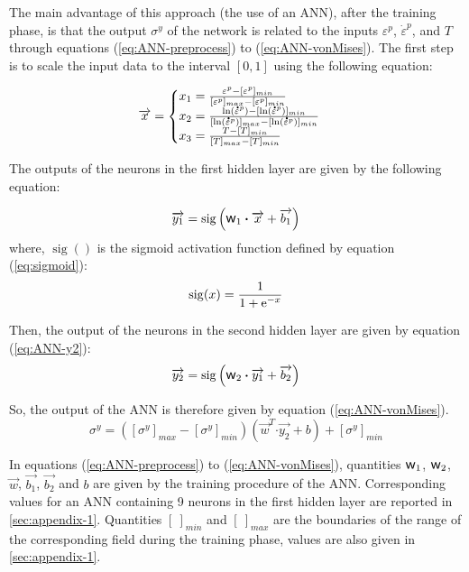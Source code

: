 \documentclass[preprint,12pt,times]{elsarticle}
\newcommand{\e}[1]{\mbox{\ensuremath{\mathrm{e}^{#1}}}}
\DeclareMathOperator{\sigmoid}{sig}
\newcommand{\dotp}{\boldsymbol{\cdot}}
\newcommand{\w}{\mbox{\large\ensuremath{\mathsf{w}}}}
\newcommand{\mdot}[1]{\accentset{\mbox{\bfseries .}}{#1}}
\begin{document}
The main advantage of this approach (the use of an ANN), after the training phase, is that the output $\sigma^y$ of the network is related to the inputs $\varepsilon^p$, ${\dot{\varepsilon}}^p$, and $T$ through equations (\ref{eq:ANN-preprocess}) to (\ref{eq:ANN-vonMises}). The first step is to scale the input data to the interval $[0,1]$ using the following equation:

\begin{equation}
\overrightarrow{x} =
\begin{cases}
x_1 = \frac{\varepsilon^p - [\varepsilon^p]_{min}}{[\varepsilon^p]_{max} - [\varepsilon^p]_{min}}\\
x_2 = \frac{\ln(\mdot{\varepsilon}^p)-[\ln(\mdot{\varepsilon}^p)]_{min}}{[\ln(\mdot{\varepsilon}^p)]_{max}-[\ln(\mdot{\varepsilon}^p)]_{min}}\label{eq:ANN-preprocess}\\
x_3 = \frac{T-[T]_{min}}{[T]_{max}-[T]_{min}}
\end{cases}
\end{equation}

The outputs of the neurons in the first hidden layer are given by the following equation:

\begin{equation}
\overrightarrow{y_1} = \sigmoid\left(\w_1 \dotp \overrightarrow{x}+ \overrightarrow{b_1}\right)\label{eq:ANN-y1}
\end{equation}
where, $\sigmoid()$ is the sigmoid activation function defined by equation (\ref{eq:sigmoid}):
\begin{equation}
\sigmoid(x)=\frac{1}{1 + \e{-x}}\label{eq:sigmoid}
\end{equation}

Then, the output of the neurons in the second hidden layer are given by equation (\ref{eq:ANN-y2}):
\begin{equation}
\overrightarrow{y_2} = \sigmoid\left(\w_2 \dotp \overrightarrow{y_1}+ \overrightarrow{b_2}\right)\label{eq:ANN-y2}
\end{equation}

So, the output of the ANN is therefore given by equation (\ref{eq:ANN-vonMises}).
\begin{equation}
\sigma^y =  \left([\sigma^y]_{max}-[\sigma^y]_{min}\right) \left(\overrightarrow{w}^T \dotp \overrightarrow{y_2} + b\right) + [\sigma^y]_{min} \label{eq:ANN-vonMises}
\end{equation}

In equations (\ref{eq:ANN-preprocess}) to (\ref{eq:ANN-vonMises}), quantities $\w_1$, $\w_2$, $\overrightarrow{w}$, $\overrightarrow{b_1}$, $\overrightarrow{b_2}$ and $b$ are given by the training procedure of the ANN. Corresponding values for an ANN containing 9 neurons in the first hidden layer are reported in \ref{sec:appendix-1}. Quantities $[\ ]_{min}$ and $[\ ]_{max}$  are the boundaries of the range of the corresponding field during the training phase, values are also given in \ref{sec:appendix-1}.
\end{document}
